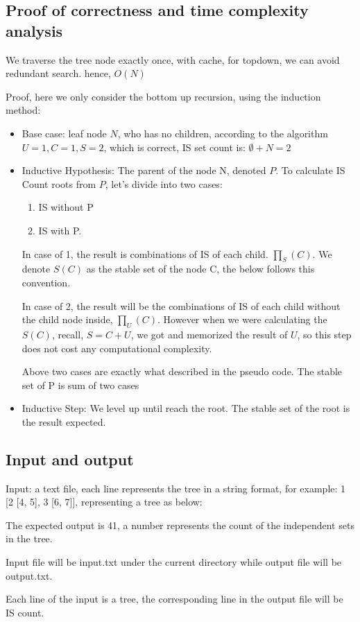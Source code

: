 \documentclass{article}
\begin{document}
\subsection*{Proof of correctness and time complexity analysis}
We traverse the tree node exactly once, with cache, for topdown, we can avoid redundant search. hence, $O(N)$

Proof, here we only consider the bottom up recursion, using the induction method:
\begin{itemize}
  \item Base case: leaf node $N$, who has no children, according to the algorithm $U=1, C=1, S=2$, which is correct, IS set count is: $\emptyset + N = 2$ 
  \item Inductive Hypothesis: The parent of the node N, denoted $P$. To calculate IS Count roots from $P$, let's divide into two cases: 
    \begin{enumerate}
      \item IS without P
      \item IS with P. 
    \end{enumerate}

    In case of 1, the result is combinations of IS of each child. $\prod_S(C)$. We denote $S(C)$ as the stable set of the node C, the below follows this convention.

    In case of 2, the result will be the combinations of IS of each child without the child node inside, $\prod_U(C)$. However when we were calculating the $S(C)$, recall, $S= C + U$, we got and memorized the result of $U$, so this step does not cost any computational complexity. 

    Above two cases are exactly what described in the pseudo code.
    The stable set of P is sum of two cases
  \item Inductive Step: We level up until reach the root. The stable set of the root is the result expected.
  \end{itemize}


\subsection*{Input and output}
Input: a text file, each line represents the tree in a string format, for example: 1 [2 [4, 5], 3 [6, 7]], representing a tree as below:



The expected output is 41, a number represents the count of the independent sets in the tree. 

Input file will be input.txt under the current directory while output file will be output.txt.

Each line of the input is a tree, the corresponding line in the output file will be IS count.
\end{document}
